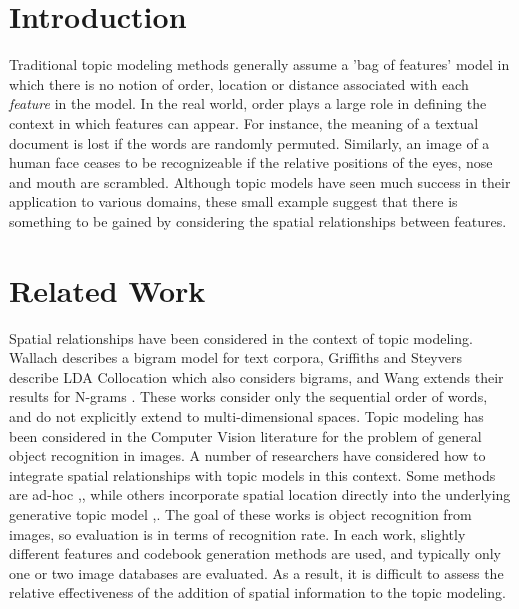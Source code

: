 \documentclass[twocolumn]{article}
\begin{document}

 

\section{Introduction}
Traditional topic modeling methods generally assume a 'bag of features' model in which there is no notion of order, location or distance associated with each \textit{feature} in the model.   In the real world, order plays a large role in defining the context in which features can appear.  For instance, the meaning of a textual document is lost if the words are randomly permuted.  Similarly, an image of a human face ceases to be recognizeable if the relative positions of the eyes, nose and mouth are scrambled.  Although topic models have seen much success in their application to various domains, these small example suggest that there is something to be gained by considering the
spatial relationships between features. 

\section{Related Work}
Spatial relationships have been considered in the context of topic modeling.  Wallach\cite{wallach2006} describes a bigram model for text corpora,  Griffiths and Steyvers \cite{griffiths2005} describe LDA Collocation which also considers bigrams, and Wang extends their results for N-grams \cite{xwang2005}.  These works consider only the sequential order of words, and do not explicitly extend to multi-dimensional spaces.  Topic modeling has been considered in the Computer Vision literature for the problem of general object recognition in images.  A number of researchers have considered how to integrate spatial relationships with topic models in this context.  Some methods are ad-hoc \cite{lazebnik2006},\cite{russell2006}, while others incorporate spatial location directly into the underlying generative topic model \cite{xwang2007},\cite{sudderth2005}.  The goal of these works is object recognition from images, so evaluation is in terms of recognition rate.  In each work, slightly different features and codebook generation methods are used, and typically only one or two image databases are evaluated.  As a result, it is difficult to assess the relative effectiveness of the addition of spatial information to the topic modeling.
\end{document}
